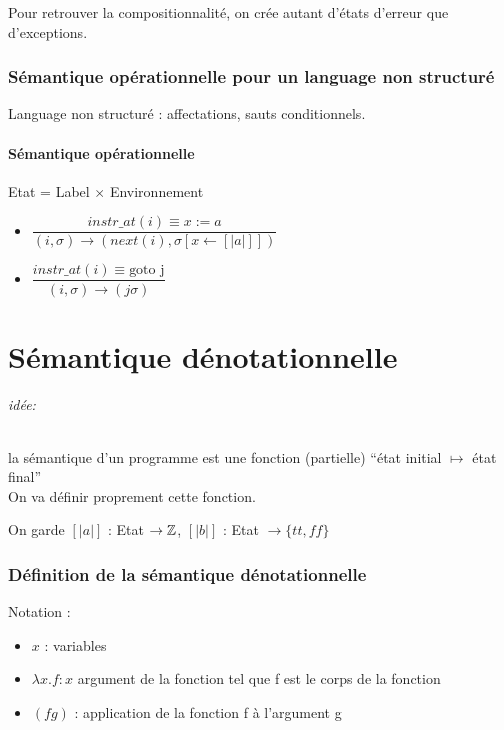 \documentclass[10pt,a4paper]{article}
\newcommand{\sem}[1]{$\left[| #1 | \right]$}
\newcommand{\semm}[1]{\left[| #1 | \right]}
\begin{document}
Pour retrouver la compositionnalité, on crée autant d'états d'erreur que d'exceptions.

\section{Sémantique opérationnelle pour un language non structuré}
Language non structuré : affectations, sauts conditionnels.

\subsection{Sémantique opérationnelle}
Etat = Label $\times$ Environnement\\

\begin{itemize}
\item $\dfrac{instr\_at(i) \equiv x:=a }{(i, \sigma) \rightarrow (next(i), \sigma[x \leftarrow \semm{a}])}$\\
\item $\dfrac{instr\_at(i) \equiv \text{goto j} }{(i, \sigma) \rightarrow (j \sigma)}$
\end{itemize}

\part{Sémantique dénotationnelle}
\paragraph{idée:} la sémantique d'un programme est une fonction (partielle) ``état initial $\mapsto$ état final''\\
On va définir proprement cette fonction.

On garde \sem{a} : Etat $\rightarrow \mathbb{Z}$, \sem{b} : Etat $\rightarrow \{tt, ff \}$

\section{Définition de la sémantique dénotationnelle}
Notation :\begin{itemize}
           \item $x$ : variables
           \item $\lambda x . f : x$  argument de la fonction tel que f est le corps de la fonction
           \item $(f g)$ : application de la fonction f à l'argument g
          \end{itemize}
\end{document}
